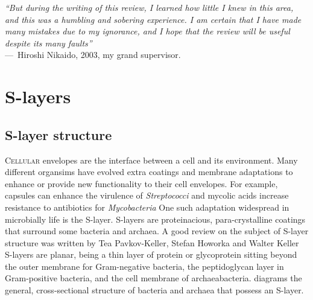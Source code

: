 %
\acresetall{}
\label{ch:Introduction}

\begin{epigraph} \emph{``But during the writing of this review, I learned how little I knew in this
    area, and this was a humbling and sobering experience. I am certain that I have made many
    mistakes due to my ignorance, and I hope that the review will be useful despite its many faults''}\\
  ---~Hiroshi Nikaido, 2003, my grand supervisor.
\end{epigraph}
\section{S-layers} \label{sec:intro-slayers}
\subsection{S-layer structure} %
\label{sub:s_layer_structure} \lettrine[lines=2]{C}{ellular} envelopes are the interface between a
cell and its environment. Many different organsims have evolved extra coatings and membrane
adaptations to enhance or provide new functionality to their cell envelopes. For example, capsules
can enhance the virulence of \textit{Streptococci} and mycolic
acids increase resistance to antibiotics for \textit{Mycobacteria}
One such adaptation widespread in microbially life is the \ac{S-layer}. \Acp{S-layer} are
proteinacious, para-crystalline coatings that surround some bacteria and
archaea. A good review on the subject of \ac{S-layer} structure was written by Tea Pavkov-Keller, Stefan Howorka and Walter Keller \Acp{S-layer} are planar, being a thin layer of protein or glycoprotein sitting beyond the outer membrane for Gram-negative bacteria, the
peptidoglycan layer in Gram-positive bacteria, and the cell membrane of
archaeabacteria.   diagrams the general,
cross-sectional structure of bacteria and archaea that possess an S-layer.

